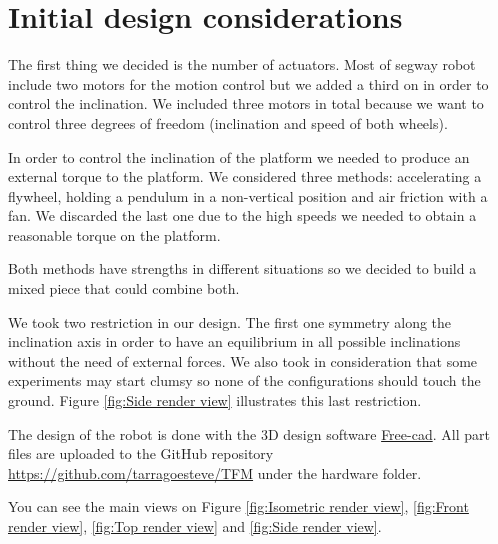 \section{Initial design considerations}
The first thing we decided is the number of actuators.
Most of segway robot include two motors for the motion control but
we added a third on in order to control the inclination.
We included three motors in total because we want to control
three degrees of freedom (inclination and speed of both wheels).

In order to control the inclination of the platform we needed to produce
an external torque to the platform. We considered three methods: accelerating
a flywheel, holding a pendulum in a non-vertical position and air friction
with a fan. We discarded the last one due to the high speeds we needed to obtain
a reasonable torque on the platform.

Both methods have strengths in different situations so we decided to build a mixed
piece that could combine both. 


We took two restriction in our design. The first one symmetry along the 
inclination axis in order to have an equilibrium in all possible inclinations
without the need of external forces. 
We also took in consideration that some experiments may start clumsy so none of
the configurations should touch the ground. Figure \ref{fig:Side render view}
illustrates this last restriction.   

The design of the robot is done with the 3D design software 
\href{https://www.freecadweb.org/}{Free-cad}.
All part files are uploaded to the GitHub repository \url{https://github.com/tarragoesteve/TFM} under the hardware folder.

You can see the main views on Figure \ref{fig:Isometric render view}, \ref{fig:Front render view}, \ref{fig:Top render view} and \ref{fig:Side render view}.

